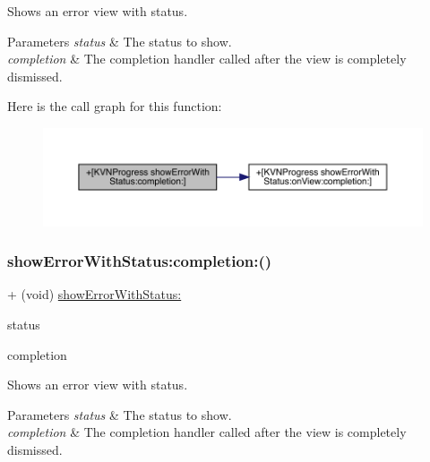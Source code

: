 Shows an error view with {\ttfamily status}. 
\begin{DoxyParams}{Parameters}
{\em status} & The status to show. \\
\hline
{\em completion} & The completion handler called after the view is completely dismissed. \\
\hline
\end{DoxyParams}
Here is the call graph for this function\+:\nopagebreak
\begin{figure}[H]
\begin{center}
\leavevmode
\includegraphics[width=350pt]{interface_k_v_n_progress_a518bc804665bbc2a01905a6b4caf9459_cgraph}
\end{center}
\end{figure}
\mbox{\label{interface_k_v_n_progress_a518bc804665bbc2a01905a6b4caf9459}} 
\subsubsection{\texorpdfstring{show\+Error\+With\+Status\+:completion\+:()}{showErrorWithStatus:completion:()}\hspace{0.1cm}{\footnotesize\ttfamily [3/3]}}
{\footnotesize\ttfamily + (void) \mbox{\hyperlink{interface_k_v_n_progress_a3125f228cdd6685e4cf74fa960bfa234}{show\+Error\+With\+Status\+:}} \begin{DoxyParamCaption}\item[{(N\+S\+String $\ast$)}]{status }\item[{completion:(K\+V\+N\+Completion\+Block)}]{completion }\end{DoxyParamCaption}}

Shows an error view with {\ttfamily status}. 
\begin{DoxyParams}{Parameters}
{\em status} & The status to show. \\
\hline
{\em completion} & The completion handler called after the view is completely dismissed. \\
\hline
\end{DoxyParams}
\mbox{\label{interface_k_v_n_progress_a639e363838fbea785adea0aa9b39ca39}} 
